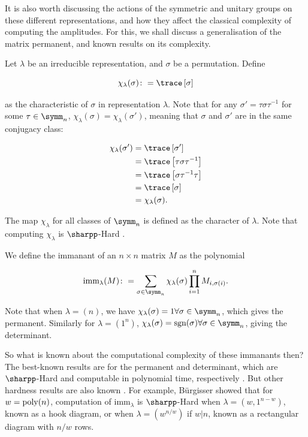 It is also worth discussing the actions of the symmetric and unitary groups on these different representations, and how they affect the classical complexity of computing the amplitudes. For this, we shall discuss a generalisation of the matrix permanent, and known results on its complexity.

Let $\lambda$ be an irreducible representation, and $\sigma$ be a permutation. Define

\begin{equation}
\chi_\lambda(\sigma) \colon= \trace\left[\sigma\right]
\end{equation}

\noindent as the characteristic of $\sigma$ in representation $\lambda$. Note that for any $\sigma' = \tau\sigma\tau^{-1}$ for some $\tau \in \symm_n$, $\chi_\lambda(\sigma) = \chi_\lambda(\sigma')$, meaning that $\sigma$ and $\sigma'$ are in the same conjugacy class:

\begin{align}
\chi_\lambda(\sigma') &= \trace\left[\sigma'\right]\\
&= \trace\left[\tau\sigma\tau^{-1}\right]\\
&= \trace\left[\sigma\tau^{-1}\tau\right]\\
&= \trace\left[\sigma\right]\\
&= \chi_\lambda(\sigma).
\end{align}

The map $\chi_\lambda$ for all classes of $\symm_n$ is defined as the character of $\lambda$. Note that computing $\chi_\lambda$ is $\sharpp$-Hard \cite{hepler1994}.

We define the immanant of an $n\times n$ matrix $M$ as the polynomial

\begin{equation}
\textrm{imm}_\lambda(M) \colon= \sum_{\sigma\in\symm_n}\chi_\lambda(\sigma)\prod_{i=1}^nM_{i,\sigma(i)}.
\end{equation}

Note that when $\lambda=(n)$, we have $\chi_\lambda(\sigma)=1\forall\sigma\in\symm_n$, which gives the permanent. Similarly for $\lambda=(1^n)$, $\chi_\lambda(\sigma)=\textrm{sgn}(\sigma)\forall\sigma\in\symm_n$, giving the determinant.

So what is known about the computational complexity of these immanants then? The best-known results are for the permanent and determinant, which are $\sharpp$-Hard and computable in polynomial time, respectively \cite{valiant1979, aaronson2011, fisikopoulos2016}. But other hardness results are also known \cite{hartmann1985, burgisser2000, brylinski2003, mertens2013}. For example, B\"urgisser \cite{burgisser2000immanants} showed that for $w=\operatorname{poly}(n)$, computation of $\textrm{imm}_\lambda$ is $\sharpp$-Hard when $\lambda=(w,1^{n-w})$, known as a hook diagram, or when $\lambda=(w^{n/w})$ if $w|n$, known as a rectangular diagram with $n/w$ rows.
